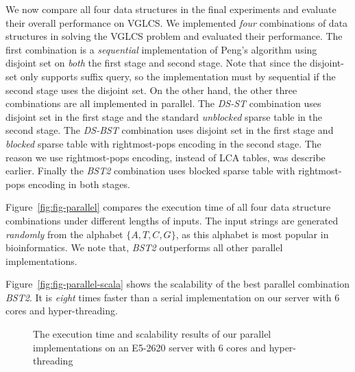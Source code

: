 We now compare all four data structures in the final experiments and
evaluate their overall performance on VGLCS.  We implemented {\em
  four} combinations of data structures in solving the VGLCS problem
and evaluated their performance.  The first combination is a {\em
  sequential} implementation of Peng's algorithm using disjoint set on
{\em both} the first stage and second stage.  Note that since the
disjoint-set only supports suffix query, so the implementation must by
sequential if the second stage uses the disjoint set.  On the other
hand, the other three combinations are all implemented in parallel.
The {\em DS-ST} combination uses disjoint set in the first stage and
the standard {\em unblocked} sparse table in the second stage.  The
{\em DS-BST} combination uses disjoint set in the first stage and {\em
  blocked} sparse table with rightmost-pops encoding in the second
stage.  The reason we use rightmost-pops encoding, instead of LCA
tables, was describe earlier.  Finally the {\em BST2} combination uses
blocked sparse table with rightmost-pops encoding in both stages.

Figure~\ref{fig:fig-parallel} compares the execution time of all four
data structure combinations under different lengths of inputs.  The
input strings are generated {\em randomly} from the alphabet $\{A, T,
C, G\}$, as this alphabet is most popular in bioinformatics.  We note
that, {\em BST2} outperforms all other parallel implementations. %

Figure~\ref{fig:fig-parallel-scala} shows the scalability of the best
parallel combination {\em BST2}.  It is {\em eight} times faster than
a serial implementation on our server with 6 cores and
hyper-threading.

\begin{figure}
  \centering
  \caption{The execution time and scalability results of our parallel
    implementations on an E5-2620 server with 6 cores and
    hyper-threading}
\end{figure}
